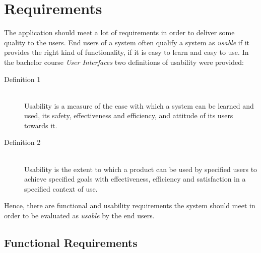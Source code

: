 \chapter{Requirements}\label{ch:requirements}

The application should meet a lot of requirements in order to deliver some quality to the users. End users of a system often qualify a system as \textit{usable} if it provides the right kind of functionality, if it is easy to learn and easy to use.
In the bachelor course \textit{User Interfaces} \citep{ui_course_detroyer} two definitions of usability were provided:
\begin{description}
	\item[Definition 1] \hfill \\
	Usability is a measure of the ease with which a system can be learned and used, its safety, effectiveness and efficiency, and attitude of its users towards it. \hfill \citep{usability-definition-preece}

	\item[Definition 2] \hfill \\
	Usability is the extent to which a product can be used by specified users to achieve specified goals with effectiveness, efficiency and satisfaction in a specified context of use. \hfill \citep{usability-definition-improved}
\end{description}

Hence, there are functional and usability requirements the system should meet in order to be evaluated as \textit{usable} by the end users.

\section{Functional Requirements}\label{sec:functional-requirements}

